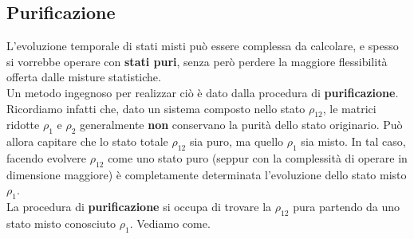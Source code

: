 \documentclass[../../InformazioneQuantistica.tex]{subfiles}
\begin{document}
\subsection{Purificazione}
L'evoluzione temporale di stati misti può essere complessa da calcolare, e spesso si vorrebbe operare con \textbf{stati puri}, senza però perdere la maggiore flessibilità offerta dalle misture statistiche.\\
Un metodo ingegnoso per realizzar ciò è dato dalla procedura di \textbf{purificazione}. Ricordiamo infatti che, dato un sistema composto nello stato $\rho_{12}$, le matrici ridotte $\rho_1$ e $\rho_2$ generalmente \textbf{non} conservano la purità dello stato originario. Può allora capitare che lo stato totale $\rho_{12}$ sia puro, ma quello  $\rho_1$ sia misto. In tal caso, facendo evolvere $\rho_{12}$ come uno stato puro (seppur con la complessità di operare in dimensione maggiore) è completamente determinata l'evoluzione dello stato misto $\rho_1$.\\
La procedura di \textbf{purificazione} si occupa di trovare la $\rho_{12}$ pura partendo da uno stato misto conosciuto $\rho_1$. Vediamo come.\\
\end{document}
